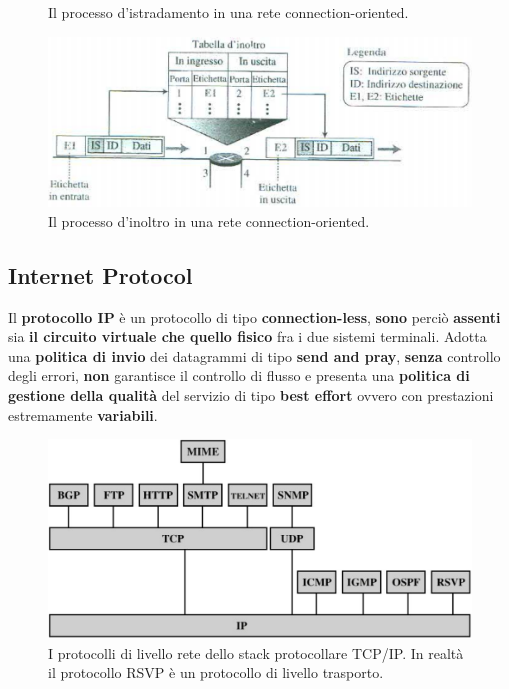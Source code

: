 \documentclass[11pt,a4paper,oneside]{book}
\theoremstyle{definition}
\begin{document}
\begin{itemize}
\begin{figure}[!h]
		      \centering
		      \caption{Il processo d'istradamento in una rete connection-oriented.}
	      \end{figure}
	      \begin{figure}[!h]
		      \includegraphics[scale=0.3]{Immagini/IP_conn_table.png}
		      \centering
		      \caption{Il processo d'inoltro in una rete connection-oriented.}
	      \end{figure}
\end{itemize}

\pagebreak

\subsection{Internet Protocol}
Il \textbf{protocollo IP} è un protocollo di tipo \textbf{connection-less}, \textbf{sono} perciò \textbf{assenti} sia \textbf{il circuito virtuale che quello fisico} fra i due sistemi terminali. Adotta una \textbf{politica di invio} dei datagrammi di tipo \textbf{send and pray}, \textbf{senza} controllo degli errori, \textbf{non} garantisce il controllo di flusso e presenta una \textbf{politica di gestione della qualità} del servizio di tipo \textbf{best effort} ovvero con prestazioni estremamente \textbf{variabili}.

\begin{figure}[!h]
	\includegraphics[scale=0.2]{Immagini/IPv4.png}
	\centering
	\caption{I protocolli di livello rete dello stack protocollare TCP/IP. In realtà il protocollo RSVP è un protocollo di livello trasporto.}
\end{figure}
\end{document}
